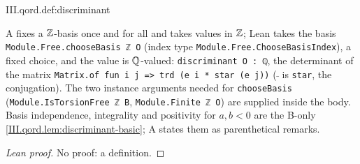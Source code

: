 \begin{definition}[discriminant]
\end{definition}
\begin{tfformal}{III.qord.def:discriminant}
\begin{tffidelity}
A fixes a $\mathbb{Z}$-basis once and for all and takes values in $\mathbb{Z}$; Lean takes the basis \texttt{Module.Free.chooseBasis ℤ O} (index type \texttt{Module.Free.ChooseBasisIndex}), a fixed choice, and the value is $\mathbb{Q}$-valued: \texttt{discriminant O : ℚ}, the determinant of the matrix \texttt{Matrix.of fun i j => trd (e i * star (e j))} ($\bar{\ }$ is \texttt{star}, the conjugation). The two instance arguments needed for \texttt{chooseBasis} (\texttt{Module.IsTorsionFree ℤ B}, \texttt{Module.Finite ℤ O}) are supplied inside the body. Basis independence, integrality and positivity for $a,b<0$ are the B-only \cref{III.qord.lem:discriminant-basic}; A states them as parenthetical remarks.
\end{tffidelity}
\end{tfformal}
\begin{proof}[Lean proof]
No proof: a definition.
\end{proof}

